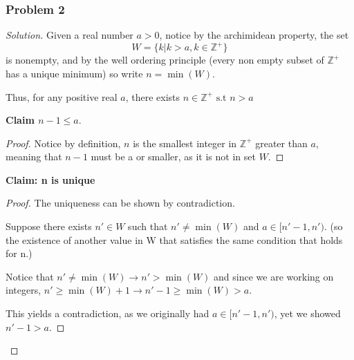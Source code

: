 \documentclass[11pt]{article}
\newcommand{\1}{\mathbf{1}}
\theoremstyle{definition}
\newenvironment{solution}{\begin{proof}[Solution]}{\end{proof}}
\begin{document}
\subsubsection*{Problem 2}
\begin{solution}
Given a real number $a > 0$, notice by the archimidean property, the set $$W = \{k  | k > a,
k \in \mathbb{Z}^{+}\}$$ is nonempty, and by the well ordering principle (every non
empty subset of $\mathbb{Z}^{+}$ has a unique minimum) so write $n = \min(W)$. \par Thus, for any positive real $a$, there exists $n \in \mathbb{Z}^{+} \text{ s.t } n > a$
\par \textbf{Claim $n - 1 \le a.$}
\begin{proof}
    Notice by definition, $n$ is the smallest integer in $\mathbb{Z}^{+}$ greater than
    $a$, meaning that $n - 1$ must be a or smaller, as it is not in set $W$.
\end{proof}
\textbf{Claim: n is unique}
\begin{proof}
The uniqueness can be shown by contradiction.
\par Suppose there exists $n' \in W$ such that $n' \ne \min(W)$ and $a \in [n' - 1, n')$. (so the existence of another value in W that satisfies the same condition that holds for n.)
\par Notice that $n' \ne \min(W) \rightarrow n' > \min(W)$  and since we are working on
integers, $n' \ge \min(W) + 1 \rightarrow n' - 1 \ge \min(W) > a$.
\par This yields a contradiction, as we originally had $a \in [n' - 1, n')$, yet we
showed $n' - 1 > a.$
\end{proof}
\end{solution}
\end{document}
